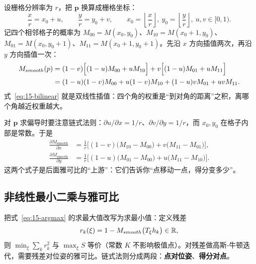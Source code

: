 设栅格分辨率为 $r$，把 $\bm{p}$ 换算成栅格坐标：
\begin{equation}
\frac{x}{r}=x_0+u,\qquad \frac{y}{r}=y_0+v,\qquad x_0=\left\lfloor\frac{x}{r}\right\rfloor,\ y_0=\left\lfloor\frac{y}{r}\right\rfloor,\ u,v\in[0,1).
\end{equation}
记四个相邻格子的概率为 $M_{00}=M(x_0,y_0)$、$M_{10}=M(x_0+1,y_0)$、$M_{01}=M(x_0,y_0+1)$、$M_{11}=M(x_0+1,y_0+1)$。先沿 $x$ 方向插值两次，再沿 $y$ 方向插值一次：
\begin{align}
M_{smooth}(p)
&=(1-v)\Big[(1-u)M_{00}+uM_{10}\Big]+v\Big[(1-u)M_{01}+uM_{11}\Big]\notag\\
&=(1-u)(1-v)M_{00}+u(1-v)M_{10}+(1-u)vM_{01}+uvM_{11}.
\label{eq:15-bilinear}
\end{align}
式~\eqref{eq:15-bilinear} 就是双线性插值：四个角的权重是``到对角的距离''之积，离哪个角越近权重越大。

对 $\bm{p}$ 求偏导时要注意链式法则：$\partial u/\partial x=1/r$、$\partial v/\partial y=1/r$，而 $x_0,y_0$ 在格子内部是常数。于是
\begin{align}
\frac{\partial M_{\mathrm{smooth}}}{\partial x}
&=\frac{1}{r}\Big[(1-v)\big(M_{10}-M_{00}\big)+v\big(M_{11}-M_{01}\big)\Big],
\label{eq:15-dMdx}\\
\frac{\partial M_{\mathrm{smooth}}}{\partial y}
&=\frac{1}{r}\Big[(1-u)\big(M_{01}-M_{00}\big)+u\big(M_{11}-M_{10}\big)\Big].
\label{eq:15-dMdy}
\end{align}
这两个式子是后面雅可比的``上游''：它们告诉你``点移动一点，得分变多少''。

\subsection{非线性最小二乘与雅可比}

把式~\eqref{eq:15-argmax} 的求最大值改写为求最小值：定义残差
\begin{equation}
r_k(\xi)=1-M_{smooth}\big(T_\xi h_k\big)\in\mathbb{R},
\end{equation}
则 $\min_\xi\sum_k r_k^2$ 与 $\max_\xi S$ 等价（常数 $K$ 不影响极值点）。对残差做高斯-牛顿迭代，需要残差对位姿的雅可比。链式法则分成两段：\textbf{点对位姿}、\textbf{得分对点}。

